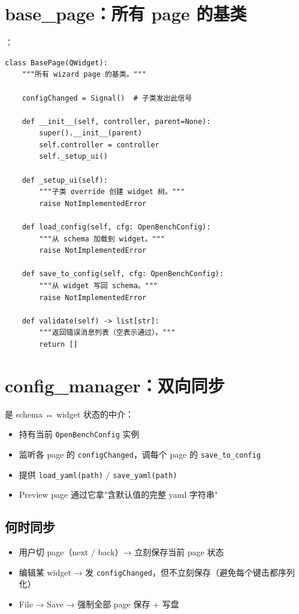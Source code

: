 \section{base\_page：所有 page 的基类}

：

\begin{verbatim}
class BasePage(QWidget):
    """所有 wizard page 的基类。"""

    configChanged = Signal()  # 子类发出此信号

    def __init__(self, controller, parent=None):
        super().__init__(parent)
        self.controller = controller
        self._setup_ui()

    def _setup_ui(self):
        """子类 override 创建 widget 树。"""
        raise NotImplementedError

    def load_config(self, cfg: OpenBenchConfig):
        """从 schema 加载到 widget。"""
        raise NotImplementedError

    def save_to_config(self, cfg: OpenBenchConfig):
        """从 widget 写回 schema。"""
        raise NotImplementedError

    def validate(self) -> list[str]:
        """返回错误消息列表（空表示通过）。"""
        return []
\end{verbatim}

\section{config\_manager：双向同步}

 是 schema ↔ widget 状态的中介：

\begin{itemize}
  \item 持有当前 \texttt{OpenBenchConfig} 实例
  \item 监听各 page 的 \texttt{configChanged}，调每个 page 的 \texttt{save\_to\_config}
  \item 提供 \texttt{load\_yaml(path)} / \texttt{save\_yaml(path)}
  \item Preview page 通过它拿"含默认值的完整 yaml 字符串"
\end{itemize}

\subsection{何时同步}

\begin{itemize}
  \item 用户切 page（next / back）→ 立刻保存当前 page 状态
  \item 编辑某 widget → 发 \texttt{configChanged}，但不立刻保存（避免每个键击都序列化）
  \item File → Save → 强制全部 page 保存 + 写盘
\end{itemize}

